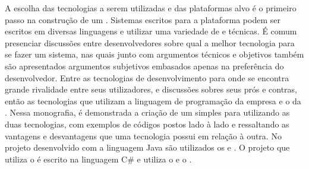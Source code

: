 A escolha das tecnologias a serem utilizadas e das plataformas alvo é o primeiro passo na construção de um . Sistemas escritos para a plataforma  podem ser escritos em diversas linguagens e utilizar uma variedade de  e técnicas. É comum presenciar discussões entre desenvolvedores sobre qual a melhor tecnologia para se fazer um sistema, nas quais junto com argumentos técnicos e objetivos também são apresentados argumentos subjetivos embasados apenas na preferência do desenvolvedor. Entre as tecnologias de desenvolvimento para  onde se encontra grande rivalidade entre seus utilizadores, e discussões sobres seus prós e contras, então as tecnologias que utilizam a linguagem de programação  da empresa  e o  da . Nessa monografia, é demonstrada a criação de um  simples para  utilizando as duas tecnologias, com exemplos de códigos postos lado à lado e ressaltando as vantagens e desvantagens que uma tecnologia possui em relação à outra. No projeto desenvolvido com a linguagem Java são utilizados os   e . O projeto que utiliza o   é escrito na linguagem C\# e utiliza o  e o .

